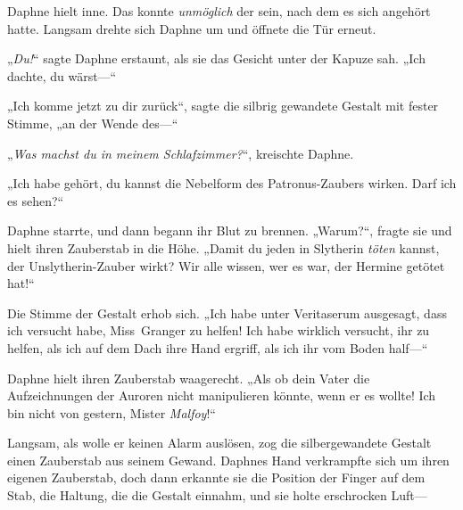 Daphne hielt inne. Das konnte \emph{unmöglich} der sein, nach dem es sich angehört hatte. Langsam drehte sich Daphne um und öffnete die Tür erneut.

„\emph{Du!}“ sagte Daphne erstaunt, als sie das Gesicht unter der Kapuze sah. „Ich dachte, du wärst—“

„Ich komme jetzt zu dir zurück“, sagte die silbrig gewandete Gestalt mit fester Stimme, „an der Wende des—“

„\emph{Was machst du in meinem Schlafzimmer?}“, kreischte Daphne.

„Ich habe gehört, du kannst die Nebelform des Patronus-Zaubers wirken. Darf ich es sehen?“

Daphne starrte, und dann begann ihr Blut zu brennen.
„Warum?“, fragte sie und hielt ihren Zauberstab in die Höhe. „Damit du jeden in Slytherin \emph{töten} kannst, der Unslytherin-Zauber wirkt? Wir alle wissen, wer es war, der Hermine getötet hat!“

Die Stimme der Gestalt erhob sich.
„Ich habe unter Veritaserum ausgesagt, dass ich versucht habe, Miss~Granger zu helfen! Ich habe wirklich versucht, ihr zu helfen, als ich auf dem Dach ihre Hand ergriff, als ich ihr vom Boden half—“

Daphne hielt ihren Zauberstab waagerecht.
„Als ob dein Vater die Aufzeichnungen der Auroren nicht manipulieren könnte, wenn er es wollte! Ich bin nicht von gestern, Mister \emph{Malfoy}!“

Langsam, als wolle er keinen Alarm auslösen, zog die silbergewandete Gestalt einen Zauberstab aus seinem Gewand. Daphnes Hand verkrampfte sich um ihren eigenen Zauberstab, doch dann erkannte sie die Position der Finger auf dem Stab, die Haltung, die die Gestalt einnahm, und sie holte erschrocken Luft—

